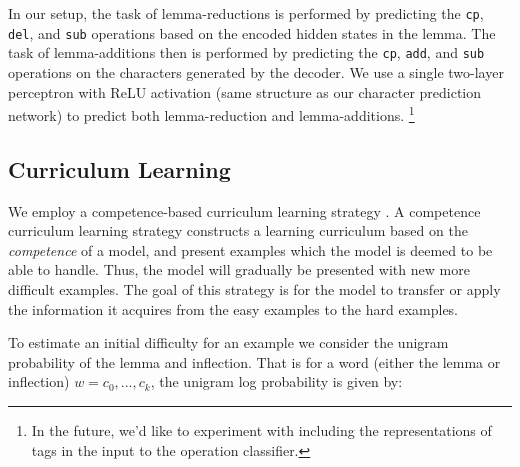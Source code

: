 \documentclass[11pt,a4paper]{article}
\newcommand\jp[1]{\textbf{JP: #1}}
\begin{document}
In our setup, the task of lemma-reductions is performed by predicting
the \texttt{cp}, \texttt{del}, and \texttt{sub} operations based on
the encoded hidden states in the lemma.  The task of lemma-additions
then is performed by predicting the \texttt{cp}, \texttt{add}, and
\texttt{sub} operations on the characters generated by the decoder.
We use a single two-layer perceptron with ReLU activation (same
structure as our character prediction network) to predict both
lemma-reduction and lemma-additions. \footnote{In the future, we'd
like to experiment with including the representations of tags in the
input to the operation classifier.}




\subsection{Curriculum Learning}


We employ a competence-based curriculum learning strategy
\cite{DBLP:conf/acl/LiuLWC20, platanios2019competence}. A competence
curriculum learning strategy constructs a learning curriculum based on
the \textit{competence} of a model, and present examples which the
model is deemed to be able to handle. Thus, the model will gradually
be presented with new more difficult examples. The goal of this
strategy is for the model to transfer or apply the information it
acquires from the easy examples to the hard examples.
 
To estimate an initial difficulty for an example we consider the
unigram probability of the lemma and inflection. That is for a word
(either the lemma or inflection) $w = c_0, ..., c_k$, the unigram log
probability is given by:
\end{document}
